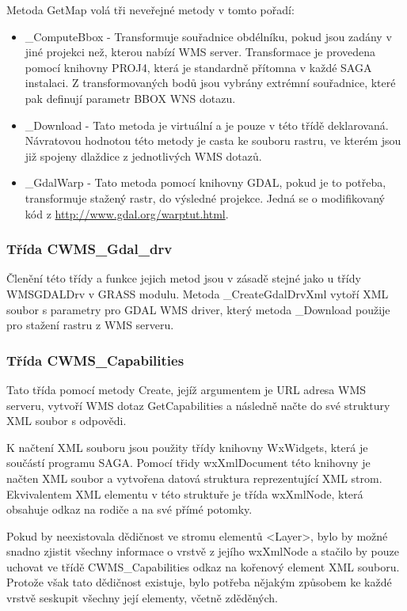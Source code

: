 \documentclass[a4paper,12pt]{article}
\begin{document}
Metoda GetMap volá tři neveřejné metody v tomto pořadí:
\begin{itemize}
 \item \_ComputeBbox - Transformuje souřadnice obdélníku, pokud jsou
   zadány v jiné projekci než, kterou nabízí WMS server. Transformace
   je provedena pomocí knihovny PROJ4, která je standardně přítomna v
   každé SAGA instalaci. Z transformovaných bodů jsou vybrány extrémní
   souřadnice, které pak definují parametr BBOX WNS dotazu.
 \item \_Download - Tato metoda je virtuální a je pouze v této třídě
   deklarovaná.  Návratovou hodnotou této metody je casta ke souboru
   rastru, ve kterém jsou již spojeny dlaždice z jednotlivých WMS
   dotazů.
 \item \_GdalWarp - Tato metoda pomocí knihovny GDAL, pokud je to
   potřeba, transformuje stažený rastr, do výsledné projekce. Jedná se
   o modifikovaný kód z \url{http://www.gdal.org/warptut.html}.
\end{itemize}

\subsubsection{Třída CWMS\_Gdal\_drv}

Členění této třídy a funkce jejich metod jsou v zásadě stejné jako u
třídy WMSGDALDrv v GRASS modulu. Metoda \_CreateGdalDrvXml vytoří XML
soubor s parametry pro GDAL WMS driver, který metoda \_Download
použije pro stažení rastru z WMS serveru.


\subsubsection{Třída CWMS\_Capabilities}

Tato třída pomocí metody Create, jejíž argumentem je URL adresa WMS
serveru, vytvoří WMS dotaz GetCapabilities a následně načte do své
struktury XML soubor s odpovědi.

K načtení XML souboru jsou použity třídy knihovny WxWidgets, která je
součástí programu SAGA. Pomocí třidy wxXmlDocument této knihovny je
načten XML soubor a vytvořena datová struktura reprezentující XML
strom. Ekvivalentem XML elementu v této struktuře je třída wxXmlNode,
která obsahuje odkaz na rodiče a na své přímé potomky.

Pokud by neexistovala dědičnost ve stromu elementů <Layer>, bylo by
možné snadno zjistit všechny informace o vrstvě z jejího wxXmlNode a
stačilo by pouze uchovat ve třídě CWMS\_Capabilities odkaz na kořenový
element XML souboru. Protože však tato dědičnost existuje, bylo
potřeba nějakým způsobem ke každé vrstvě seskupit všechny její
elementy, včetně zděděných.
  
\end{document}
